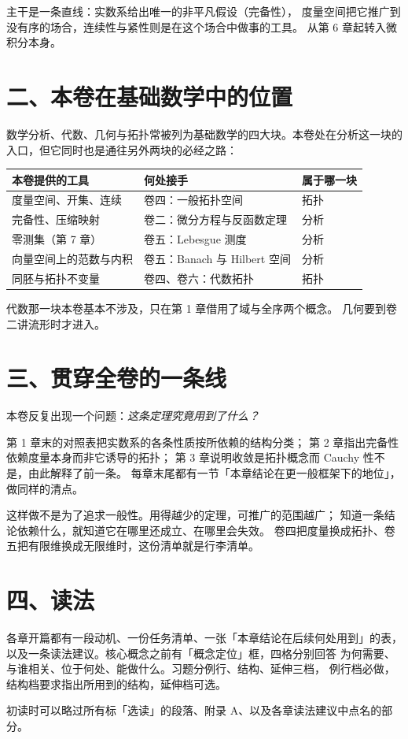 主干是一条直线：实数系给出唯一的非平凡假设（完备性），
度量空间把它推广到没有序的场合，连续性与紧性则是在这个场合中做事的工具。
从第 6 章起转入微积分本身。

\section*{二、本卷在基础数学中的位置}

数学分析、代数、几何与拓扑常被列为基础数学的四大块。本卷处在分析这一块的
入口，但它同时也是通往另外两块的必经之路：

\begin{center}
\begin{tabular}{@{}lll@{}}
  \toprule
  本卷提供的工具 & 何处接手 & 属于哪一块 \\
  \midrule
  度量空间、开集、连续     & 卷四：一般拓扑空间       & 拓扑 \\
  完备性、压缩映射         & 卷二：微分方程与反函数定理 & 分析 \\
  零测集（第 7 章）        & 卷五：Lebesgue 测度      & 分析 \\
  向量空间上的范数与内积   & 卷五：Banach 与 Hilbert 空间 & 分析 \\
  同胚与拓扑不变量         & 卷四、卷六：代数拓扑     & 拓扑 \\
  \bottomrule
\end{tabular}
\end{center}

代数那一块本卷基本不涉及，只在第 1 章借用了域与全序两个概念。
几何要到卷二讲流形时才进入。

\section*{三、贯穿全卷的一条线}

本卷反复出现一个问题：\emph{这条定理究竟用到了什么？}

第 1 章末的对照表把实数系的各条性质按所依赖的结构分类；
第 2 章指出完备性依赖度量本身而非它诱导的拓扑；
第 3 章说明收敛是拓扑概念而 Cauchy 性不是，由此解释了前一条。
每章末尾都有一节「本章结论在更一般框架下的地位」，做同样的清点。

这样做不是为了追求一般性。用得越少的定理，可推广的范围越广；
知道一条结论依赖什么，就知道它在哪里还成立、在哪里会失效。
卷四把度量换成拓扑、卷五把有限维换成无限维时，这份清单就是行李清单。

\section*{四、读法}

各章开篇都有一段动机、一份任务清单、一张「本章结论在后续何处用到」的表，
以及一条读法建议。核心概念之前有「概念定位」框，四格分别回答
为何需要、与谁相关、位于何处、能做什么。习题分例行、结构、延伸三档，
例行档必做，结构档要求指出所用到的结构，延伸档可选。

初读时可以略过所有标「选读」的段落、附录 A、以及各章读法建议中点名的部分。
